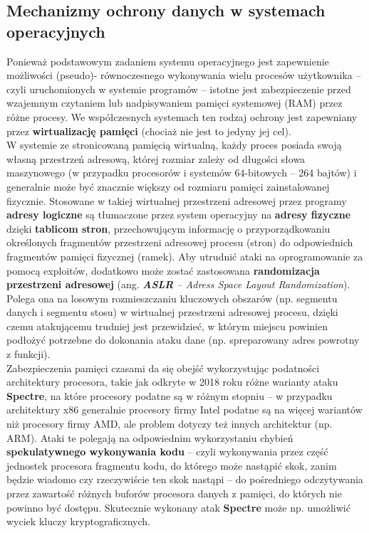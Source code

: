 \subsection{Mechanizmy ochrony danych w systemach operacyjnych}

Ponieważ podstawowym zadaniem systemu operacyjnego jest zapewnienie możliwości (pseudo)- równoczesnego wykonywania wielu procesów użytkownika – czyli uruchomionych w systemie programów – istotne jest zabezpieczenie przed wzajemnym czytaniem lub nadpisywaniem pamięci systemowej (RAM) przez różne procesy. We współczesnych systemach ten rodzaj ochrony jest zapewniany przez \textbf{wirtualizację pamięci} (chociaż nie jest to jedyny jej cel).\\

W systemie ze stronicowaną pamięcią wirtualną, każdy proces posiada swoją własną przestrzeń adresową, której rozmiar zależy od długości słowa maszynowego (w przypadku procesorów i systemów 64-bitowych – 264 bajtów) i generalnie może być znacznie większy od rozmiaru pamięci zainstalowanej fizycznie. Stosowane w takiej wirtualnej przestrzeni adresowej przez programy \textbf{adresy logiczne} są tłumaczone przez system operacyjny na \textbf{adresy fizyczne} dzięki \textbf{tablicom stron}, przechowującym informację o przyporządkowaniu określonych fragmentów przestrzeni adresowej procesu (stron) do odpowiednich fragmentów pamięci fizycznej (ramek). Aby utrudnić ataki na oprogramowanie za pomocą exploitów, dodatkowo może zostać zastosowana \textbf{randomizacja przestrzeni adresowej} (ang. \textit{\textbf{ASLR} – Adress Space Layout Randomization}). Polega ona na losowym rozmieszczaniu kluczowych obszarów (np. segmentu danych i segmentu stosu) w wirtualnej przestrzeni adresowej procesu, dzięki czemu atakującemu trudniej jest przewidzieć, w którym miejscu powinien podłożyć potrzebne do dokonania ataku dane (np. spreparowany adres powrotny z funkcji).\\

Zabezpieczenia pamięci czasami da się obejść wykorzystując podatności architektury procesora, takie jak odkryte w 2018 roku różne warianty ataku \textbf{Spectre}, na które procesory podatne są w różnym stopniu – w przypadku architektury x86 generalnie procesory firmy Intel podatne są na więcej wariantów niż procesory firmy AMD, ale problem dotyczy też innych architektur (np. ARM). Ataki te polegają na odpowiednim wykorzystaniu chybień \textbf{spekulatywnego wykonywania kodu} – czyli wykonywania przez część jednostek procesora fragmentu kodu, do którego może nastąpić skok, zanim będzie wiadomo czy rzeczywiście ten skok nastąpi – do pośredniego odczytywania przez zawartość różnych buforów procesora danych z pamięci, do których nie powinno być dostępu. Skutecznie wykonany atak \textbf{Spectre} może np. umożliwić wyciek kluczy kryptograficznych.\\

